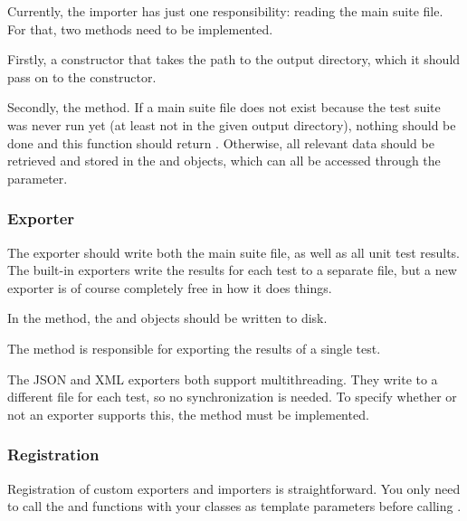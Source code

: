 Currently, the importer has just one responsibility: reading the main suite file. For that, two methods need to be implemented.

Firstly, a constructor that takes the path to the output directory, which it should pass on to the  constructor.

Secondly, the  method. If a main suite file does not exist because the test suite was never run yet (at least not in the given output directory), nothing should be done and this function should return . Otherwise, all relevant data should be retrieved and stored in the  and  objects, which can all be accessed through the  parameter.

\subsubsection{Exporter}
\label{section:output:custom:exporter}

The exporter should write both the main suite file, as well as all unit test results. The built-in exporters write the results for each test to a separate file, but a new exporter is of course completely free in how it does things.

In the  method, the  and  objects should be written to disk.

The  method is responsible for exporting the results of a single test.

The JSON and XML exporters both support multithreading. They write to a different file for each test, so no synchronization is needed. To specify whether or not an exporter supports this, the  method must be implemented.

\subsubsection{Registration}
\label{section:output:custom:register}

Registration of custom exporters and importers is straightforward. You only need to call the  and  functions with your classes as template parameters before calling .

